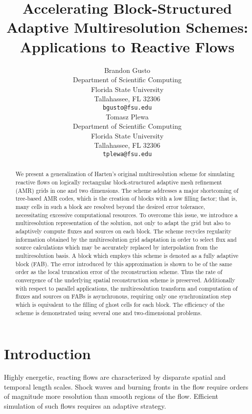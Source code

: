 \documentclass[]{article}
\title{Accelerating Block-Structured Adaptive Multiresolution Schemes: Applications to Reactive Flows}
\author{
  Brandon Gusto\\
  Department of Scientific Computing\\
  Florida State University\\
  Tallahassee, FL 32306 \\
  \texttt{bgusto@fsu.edu} \\
  \And
  Tomasz Plewa \\
  Department of Scientific Computing\\
  Florida State University\\
  Tallahassee, FL 32306 \\
  \texttt{tplewa@fsu.edu} \\
}
\begin{document}
\maketitle

\begin{abstract}
    We present a generalization of Harten's original multiresolution scheme for
    simulating reactive flows on logically rectangular block-structured adaptive
    mesh refinement (AMR) grids in one and two dimensions. The scheme addresses
    a major shortcoming of tree-based AMR codes, which is the creation of blocks
    with a low filling factor; that is, many cells in such a block are resolved
    beyond the desired error tolerance, necessitating excessive computational
    resources.  To overcome this issue, we introduce a multiresolution
    representation of the solution, not only to adapt the grid but also to
    adaptively compute fluxes and sources on each block. The scheme recycles
    regularity information obtained by the multiresolution grid adaptation in
    order to select flux and source calculations which may be accurately
    replaced by interpolation from the multiresolution basis. A block which
    employs this scheme is denoted as a fully adaptive block (FAB).  The error
    introduced by this approximation is shown to be of the same order as the
    local truncation error of the reconstruction scheme. Thus the rate of
    convergence of the underlying spatial reconstruction scheme is preserved.
    Additionally with respect to parallel applications, the multiresolution
    transform and computation of fluxes and sources on FABs is asynchronous,
    requiring only one synchronization step which is equivalent to the filling
    of ghost cells for each block. The efficiency of the scheme is demonstrated
    using several one and two-dimensional problems.
\end{abstract}


\section{Introduction}

    Highly energetic, reacting flows are characterized by disparate spatial and
    temporal length scales. Shock waves and burning fronts in the flow require
    orders of magnitude more resolution than smooth regions of the flow.
    Efficient simulation of such flows requires an adaptive strategy.
\end{document}
